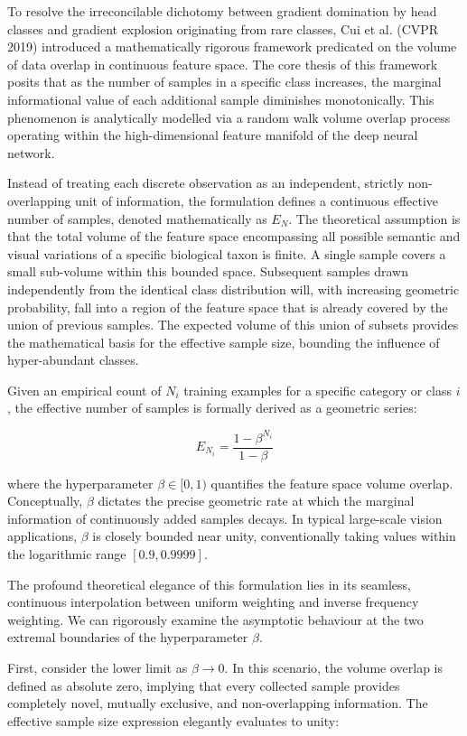 To resolve the irreconcilable dichotomy between gradient domination by head classes and gradient explosion originating from rare classes, Cui et al. (CVPR 2019) introduced a mathematically rigorous framework predicated on the volume of data overlap in continuous feature space. The core thesis of this framework posits that as the number of samples in a specific class increases, the marginal informational value of each additional sample diminishes monotonically. This phenomenon is analytically modelled via a random walk volume overlap process operating within the high-dimensional feature manifold of the deep neural network.

Instead of treating each discrete observation as an independent, strictly non-overlapping unit of information, the formulation defines a continuous effective number of samples, denoted mathematically as $E_N$. The theoretical assumption is that the total volume of the feature space encompassing all possible semantic and visual variations of a specific biological taxon is finite. A single sample covers a small sub-volume within this bounded space. Subsequent samples drawn independently from the identical class distribution will, with increasing geometric probability, fall into a region of the feature space that is already covered by the union of previous samples. The expected volume of this union of subsets provides the mathematical basis for the effective sample size, bounding the influence of hyper-abundant classes.

Given an empirical count of $N_i$ training examples for a specific category or class $i$, the effective number of samples is formally derived as a geometric series:

\[
  E_{N_i} = \frac{1 - \beta^{N_i}}{1 - \beta}
\]

where the hyperparameter $\beta \in [0, 1)$ quantifies the feature space volume overlap. Conceptually, $\beta$ dictates the precise geometric rate at which the marginal information of continuously added samples decays. In typical large-scale vision applications, $\beta$ is closely bounded near unity, conventionally taking values within the logarithmic range $[0.9, 0.9999]$.

The profound theoretical elegance of this formulation lies in its seamless, continuous interpolation between uniform weighting and inverse frequency weighting. We can rigorously examine the asymptotic behaviour at the two extremal boundaries of the hyperparameter $\beta$.

First, consider the lower limit as $\beta \to 0$. In this scenario, the volume overlap is defined as absolute zero, implying that every collected sample provides completely novel, mutually exclusive, and non-overlapping information. The effective sample size expression elegantly evaluates to unity:

